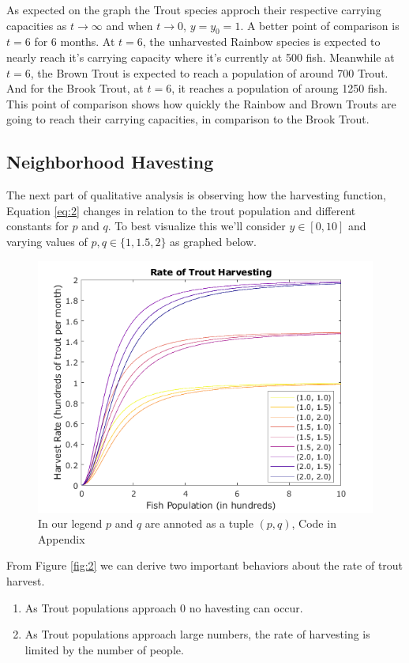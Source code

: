 \documentclass[letterpaper,12pt]{article}
\begin{document}
As expected on the graph the Trout species approch their respective carrying capacities as \(t \to \infty\) and when \(t \to 0\), \(y = y_0 = 1\).
A better point of comparison is \(t = 6\) for 6 months.
At \(t = 6\), the unharvested Rainbow species is expected to nearly reach it's carrying capacity where it's currently at 500 fish.
Meanwhile at \(t = 6\), the Brown Trout is expected to reach a population of around 700 Trout.
And for the Brook Trout, at \(t = 6\), it reaches a population of aroung 1250 fish.
This point of comparison shows how quickly the Rainbow and Brown Trouts are going to reach their carrying capacities, in comparison to the Brook Trout.
\subsection{Neighborhood Havesting}
The next part of qualitative analysis is observing how the harvesting function, Equation \eqref{eq:2} changes in relation to the trout population and different constants for \(p\) and \(q\).
To best visualize this we'll consider \(y \in [0,10]\) and varying values of \(p,q \in \{1, 1.5, 2\}\) as graphed below.
\newline
\begin{figure}[H]
    \centering
    \includegraphics{./figures/fig.3.3.1.png}
    \caption{In our legend \(p\) and \(q\) are annoted as a tuple \((p,q)\), Code in Appendix}
    \label{fig:2}
\end{figure}
From Figure \eqref{fig:2} we can derive two important behaviors about the rate of trout harvest.
\begin{enumerate}
    \item As Trout populations approach 0 no havesting can occur.
    \item As Trout populations approach large numbers, the rate of harvesting is limited by the number of people.
\end{enumerate}
\end{document}
